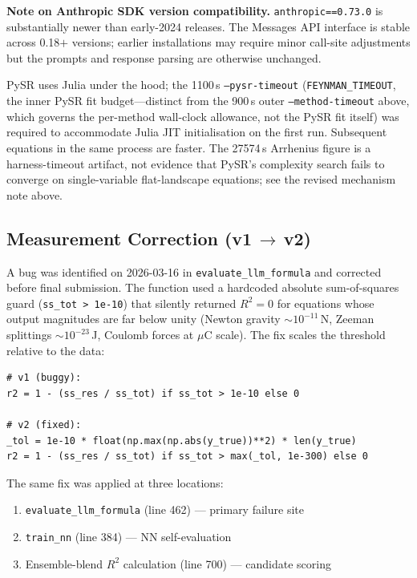 \documentclass[twoside,11pt]{article}
\begin{document}
\noindent\textbf{Note on Anthropic SDK version compatibility.}
\texttt{anthropic==0.73.0} is substantially newer than early-2024 releases.
The Messages API interface is stable across 0.18$+$ versions; earlier
installations may require minor call-site adjustments but the prompts and
response parsing are otherwise unchanged.

\noindent PySR uses Julia under the hood; the 1100\,s
\texttt{--pysr-timeout} (\texttt{FEYNMAN\_TIMEOUT}, the inner PySR fit
budget---distinct from the 900\,s outer \texttt{--method-timeout} above,
which governs the per-method wall-clock allowance, not the PySR fit itself)
was required to accommodate Julia JIT initialisation on the first run.
Subsequent equations in the same process are faster. The 27574\,s Arrhenius
figure is a harness-timeout artifact, not evidence that PySR's complexity
search fails to converge on single-variable flat-landscape equations; see
the revised mechanism note above.

\subsection*{Measurement Correction (v1\,$\to$\,v2)}
\label{sec:r2_measurement_bugfix}

A bug was identified on 2026-03-16 in \texttt{evaluate\_llm\_formula}
and corrected before final submission. The function used a hardcoded
absolute sum-of-squares guard (\texttt{ss\_tot > 1e-10}) that silently
returned $R^2=0$ for equations whose output magnitudes are far below unity
(Newton gravity $\sim\!10^{-11}$\,N, Zeeman splittings $\sim\!10^{-23}$\,J,
Coulomb forces at $\mu$C scale). The fix scales the threshold relative
to the data:

\begin{verbatim}
# v1 (buggy):
r2 = 1 - (ss_res / ss_tot) if ss_tot > 1e-10 else 0

# v2 (fixed):
_tol = 1e-10 * float(np.max(np.abs(y_true))**2) * len(y_true)
r2 = 1 - (ss_res / ss_tot) if ss_tot > max(_tol, 1e-300) else 0
\end{verbatim}

The same fix was applied at three locations:
\begin{enumerate}
  \item \texttt{evaluate\_llm\_formula} (line 462) — primary failure site
  \item \texttt{train\_nn} (line 384) — NN self-evaluation
  \item Ensemble-blend $R^2$ calculation (line 700) — candidate scoring
\end{enumerate}
\end{document}
